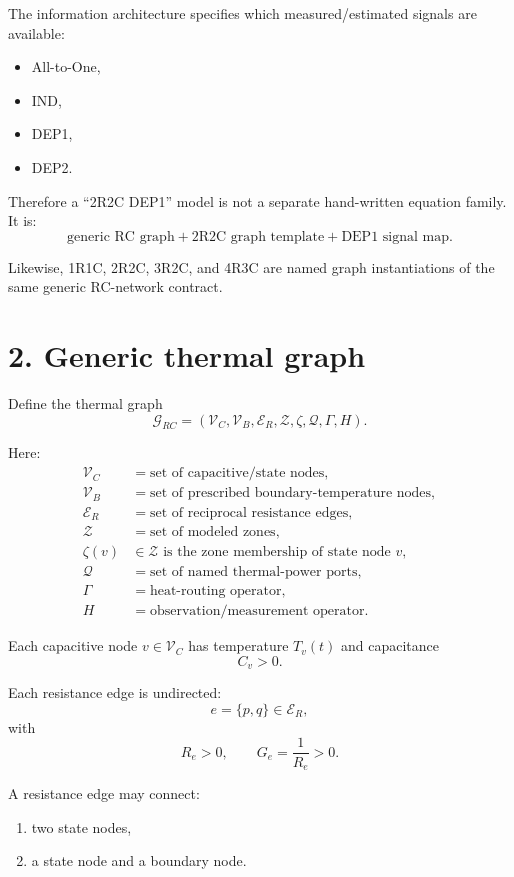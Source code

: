 \documentclass[11pt]{article}
\newcommand{\Vc}{\mathcal{V}_{C}}
\newcommand{\Vb}{\mathcal{V}_{B}}
\newcommand{\Er}{\mathcal{E}_{R}}
\newcommand{\Qset}{\mathcal{Q}}
\newcommand{\Zset}{\mathcal{Z}}
\begin{document}
The information architecture specifies which measured/estimated signals are
available:
\begin{itemize}
    \item All-to-One,
    \item IND,
    \item DEP1,
    \item DEP2.
\end{itemize}

Therefore a ``2R2C DEP1'' model is not a separate hand-written equation family.
It is:
\[
\boxed{
\text{generic RC graph}
+
\text{2R2C graph template}
+
\text{DEP1 signal map}.
}
\]

Likewise, 1R1C, 2R2C, 3R2C, and 4R3C are named graph instantiations of the
same generic RC-network contract.

\section*{2. Generic thermal graph}

Define the thermal graph
\[
\boxed{
\mathcal{G}_{RC}
=
(\Vc,\Vb,\Er,\Zset,\zeta,\Qset,\Gamma,H).
}
\]

Here:
\begin{align*}
\Vc &= \text{set of capacitive/state nodes},\\
\Vb &= \text{set of prescribed boundary-temperature nodes},\\
\Er &= \text{set of reciprocal resistance edges},\\
\Zset &= \text{set of modeled zones},\\
\zeta(v) &\in \Zset \text{ is the zone membership of state node }v,\\
\Qset &= \text{set of named thermal-power ports},\\
\Gamma &= \text{heat-routing operator},\\
H &= \text{observation/measurement operator}.
\end{align*}

Each capacitive node $v\in\Vc$ has temperature $T_v(t)$ and capacitance
\[
\boxed{C_v>0.}
\]

Each resistance edge is undirected:
\[
e=\{p,q\}\in\Er,
\]
with
\[
\boxed{R_e>0,\qquad G_e=\frac{1}{R_e}>0.}
\]

A resistance edge may connect:
\begin{enumerate}[label=(\roman*)]
    \item two state nodes,
    \item a state node and a boundary node.
\end{enumerate}
\end{document}
